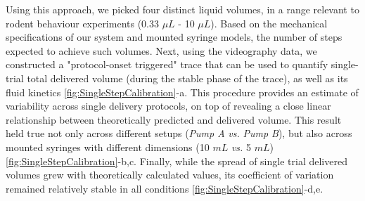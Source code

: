 Using this approach, we picked four distinct liquid volumes, in a range relevant to rodent behaviour experiments (0.33 $\mu L$ - 10 $\mu L$). Based on the mechanical specifications of our system and mounted syringe models, the number of steps expected to achieve such volumes. Next, using the videography data, we constructed a "protocol-onset triggered" trace that can be used to quantify single-trial total delivered volume (during the stable phase of the trace), as well as its fluid kinetics \cref{fig:SingleStepCalibration}-a. This procedure provides an estimate of variability across single delivery protocols, on top of revealing a close linear relationship between theoretically predicted and delivered volume. This result held true not only across different setups (\textit{Pump A} \textit{vs.} \textit{Pump B}), but also across mounted syringes with different dimensions (10 $mL$ \textit{vs.} 5 $mL$) \cref{fig:SingleStepCalibration}-b,c. Finally, while the spread of single trial delivered volumes grew with theoretically calculated values, its coefficient of variation remained relatively stable in all conditions \cref{fig:SingleStepCalibration}-d,e.



